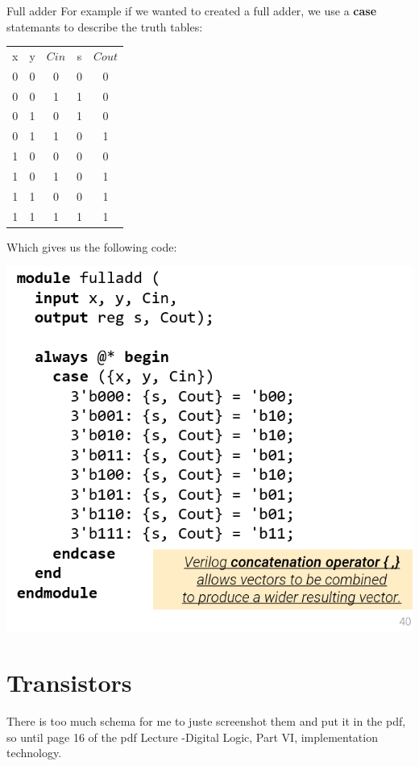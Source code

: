 \begin{parag}{Full adder}
    For example if we wanted to created a full adder, we use a \textbf{case} statemants to describe the truth tables:
    \begin{center}
    \begin{tabular}{ccccc}
        x & y & $Cin$ & s & $Cout$\\
        0 & 0 & 0 & 0 & 0\\
        0 & 0 & 1 & 1 & 0\\
        0 & 1 & 0 & 1 & 0\\
        0 & 1 & 1 & 0 & 1\\
        1 & 0 & 0 & 0 & 0\\
        1 & 0 & 1 & 0 & 1\\
        1 & 1 & 0 & 0 & 1\\
        1 & 1 & 1 & 1 & 1 
    \end{tabular}
    \end{center}
Which gives us the following code:
\begin{center}
    \includegraphics[scale=0.7]{42025-03-26.png}
    
\end{center}


\end{parag}




    \section{Transistors}
    There is too much schema for me to juste screenshot them and put it in the pdf, so until page 16 of the pdf Lecture -Digital Logic, Part VI, implementation technology.




